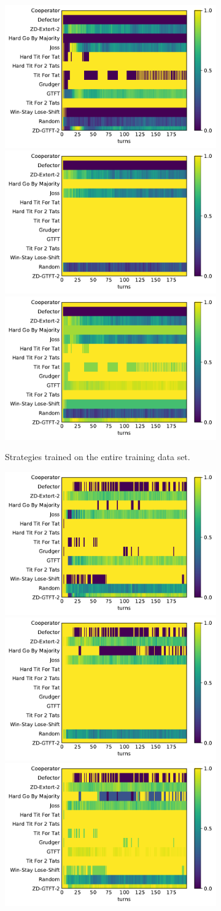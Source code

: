 \begin{figure}[!htbp]
    \begin{subfigure}{\textwidth}
        \includegraphics[width=.3\textwidth]{src/chapters/07/img/stewart_lstm_sequence_0.pdf}
        \includegraphics[width=.3\textwidth]{src/chapters/07/img/stewart_lstm_sequence_1.pdf}
        \includegraphics[width=.3\textwidth]{src/chapters/07/img/stewart_lstm_sequence_0_78.pdf}
        \caption{Strategies trained on the entire training data set.}
    \end{subfigure}
    \begin{subfigure}{\textwidth}
        \includegraphics[width=.3\textwidth]{src/chapters/07/img/stewart_top_twenty_sequence_0.pdf}
        \includegraphics[width=.3\textwidth]{src/chapters/07/img/stewart_top_twenty_sequence_1.pdf}
        \includegraphics[width=.3\textwidth]{src/chapters/07/img/stewart_top_twenty_sequence_0_78.pdf}

\end{subfigure}
\end{figure}
